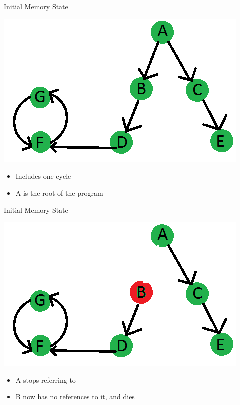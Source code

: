 \documentclass{beamer}
\begin{document}
\begin{frame}{Initial Memory State}
	\begin{center}
		\includegraphics[width=\textwidth]{graphics/memState0.png}
	\end{center}
	\begin{itemize}
		\item Includes one cycle
		\item A is the root of the program %
	\end{itemize}
\end{frame}
\begin{frame}{Initial Memory State}
	\begin{center}
		\includegraphics[width=\textwidth]{graphics/memState1.png}
	\end{center}
	\begin{itemize}
		\item A stops referring to 
		\item  B now has no references to it, and dies
	\end{itemize}
\end{frame}
\end{document}

